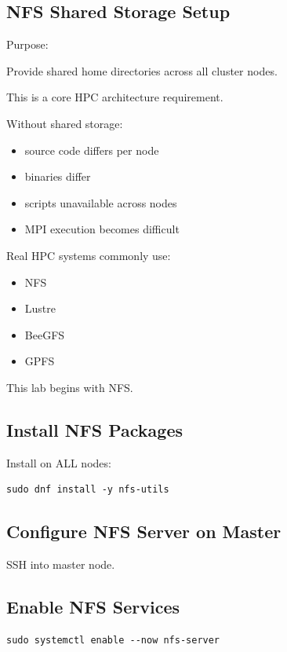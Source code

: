 \documentclass[11pt]{article}
\begin{document}
\subsection{NFS Shared Storage Setup}
\label{sec:org0259b23}

Purpose:

Provide shared home directories across all cluster nodes.

This is a core HPC architecture requirement.

Without shared storage:

\begin{itemize}
\item source code differs per node
\item binaries differ
\item scripts unavailable across nodes
\item MPI execution becomes difficult
\end{itemize}

Real HPC systems commonly use:

\begin{itemize}
\item NFS
\item Lustre
\item BeeGFS
\item GPFS
\end{itemize}

This lab begins with NFS.
\subsection{Install NFS Packages}
\label{sec:orgc0cb0da}

Install on ALL nodes:

\begin{verbatim}
sudo dnf install -y nfs-utils
\end{verbatim}
\subsection{Configure NFS Server on Master}
\label{sec:orge778bc9}

SSH into master node.
\subsection{Enable NFS Services}
\label{sec:org9046aec}

\begin{verbatim}
sudo systemctl enable --now nfs-server
\end{verbatim}
\end{document}

